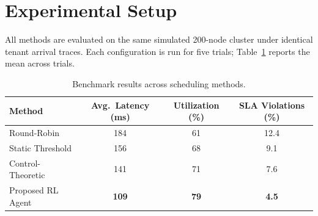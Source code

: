 \section{Experimental Setup}
All methods are evaluated on the same simulated 200-node cluster under
identical tenant arrival traces. Each configuration is run for five trials;
Table~\ref{tab:results} reports the mean across trials.

\begin{table}[htbp]
\centering
\caption{Benchmark results across scheduling methods.}
\label{tab:results}
\begin{tabularx}{\textwidth}{@{}X c c c@{}}
\toprule
\textbf{Method} & \textbf{Avg.\ Latency (ms)} & \textbf{Utilization (\%)} & \textbf{SLA Violations (\%)} \\
\midrule
Round-Robin        & 184 & 61 & 12.4 \\
\rowcolor{softGreen}
Static Threshold    & 156 & 68 & 9.1  \\
Control-Theoretic   & 141 & 71 & 7.6  \\
\rowcolor{softGreen}
Proposed RL Agent   & \textbf{109} & \textbf{79} & \textbf{4.5} \\
\bottomrule
\end{tabularx}
\end{table}
